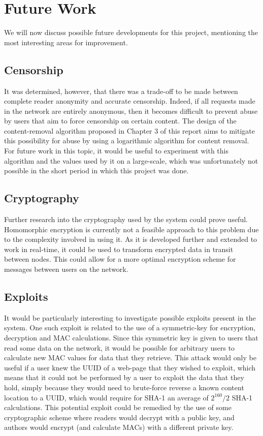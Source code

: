 \chapter{Future Work}

We will now discuss possible future developments for this project, mentioning the most
interesting areas for improvement.

\section{Censorship}

It was determined, however, that there was a trade-off to be made between complete
reader anonymity and accurate censorship. Indeed, if all requests made in the network
are entirely anonymous, then it becomes difficult to prevent abuse by users that
aim to force censorship on certain content. The design of the content-removal algorithm
proposed in Chapter 3 of this report aims to mitigate this possibility for abuse
by using a logarithmic algorithm for content removal. For future work in this
topic, it would be useful to experiment with this algorithm and the values used by
it on a large-scale, which was unfortunately not possible in the short period in which this
project was done.

\section{Cryptography}

Further research into the cryptography used by the system could prove useful.
Homomorphic encryption is currently not a feasible approach to this problem due to
the complexity involved in using it. As it is developed further and extended to work
in real-time, it could be used to transform encrypted data in transit between nodes.
This could allow for a more optimal encryption scheme for messages between
users on the network.

\section{Exploits}

It would be particularly interesting to investigate possible exploits present in the
system. One such exploit is related to the use of a symmetric-key for encryption,
decryption and MAC calculations. Since this symmetric key is given to users that read
some data on the network, it would be possible for arbitrary users to calculate new
MAC values for data that they retrieve. This attack would only be useful if a user
knew the UUID of a web-page that they wished to exploit, which means that it could
not be performed by a user to exploit the data that they hold, simply because they
would need to brute-force reverse a known content location to a UUID, which would
require for SHA-1 an average of $2^{160} / 2$ SHA-1 calculations.
This potential exploit could be remedied by the use of some cryptographic scheme where
readers would decrypt with a public key, and authors would encrypt (and calculate MACs)
with a different private key.


